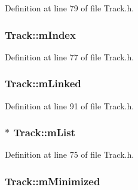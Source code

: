 Definition at line 79 of file Track.\+h.

\subsubsection[{\texorpdfstring{m\+Index}{mIndex}}]{ Track\+::m\+Index\hspace{0.3cm}{\ttfamily [protected]}}\hypertarget{class_track_ada3ccc3db7f1c8f6249260335b12d1b4}{}\label{class_track_ada3ccc3db7f1c8f6249260335b12d1b4}


Definition at line 77 of file Track.\+h.

\subsubsection[{\texorpdfstring{m\+Linked}{mLinked}}]{ Track\+::m\+Linked\hspace{0.3cm}{\ttfamily [protected]}}\hypertarget{class_track_aaaa8f25fed1beb509a3ada2ca81608b0}{}\label{class_track_aaaa8f25fed1beb509a3ada2ca81608b0}


Definition at line 91 of file Track.\+h.

\subsubsection[{\texorpdfstring{m\+List}{mList}}]{$\ast$ Track\+::m\+List\hspace{0.3cm}{\ttfamily [protected]}}\hypertarget{class_track_aee09798f96d0ead19b1061b858548dc5}{}\label{class_track_aee09798f96d0ead19b1061b858548dc5}


Definition at line 75 of file Track.\+h.

\subsubsection[{\texorpdfstring{m\+Minimized}{mMinimized}}]{ Track\+::m\+Minimized\hspace{0.3cm}{\ttfamily [protected]}}\hypertarget{class_track_ab767c29441016ba672a1f105389190ff}{}\label{class_track_ab767c29441016ba672a1f105389190ff}


